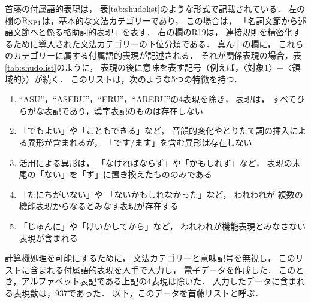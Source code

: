 \documentclass[japanese]{jnlp_1.3e}
\begin{document}
\begin{table}[b]

\end{table}

首藤の付属語的表現は，
表\ref{tab:shudolist}のような形式で記載されている．
左の欄の${\rm R_{NP1}}$は，基本的な文法カテゴリーであり，
この場合は，
「名詞文節から述語文節へと係る格助詞的表現」を表す．
右の欄のR19は，
連接規則を精密化するために導入された文法カテゴリーの下位分類である．
真ん中の欄に，
これらのカテゴリーに属する付属語的表現が記述される．
それが関係表現の場合，表\ref{tab:shudolist}のように，
表現の後に意味を表す記号（例えば，〈対象1〉+〈領域的〉）が続く．
このリストは，次のような5つの特徴を持つ．
\begin{enumerate}
\item ``ASU''，``ASERU''，``ERU''，``ARERU''の4表現を除き，
      表現は，
      すべてひらがな表記であり，漢字表記のものは存在しない
\item 「でもよい」や「こともできる」など，
      音韻的変化やとりたて詞の挿入による異形が含まれるが，
      「です/ます」を含む異形は存在しない
\item 活用による異形は，
      「なければならず」や「かもしれず」など，
      表現の末尾の「ない」を「ず」に置き換えたもののみである
\item 「たにちがいない」や
      「ないかもしれなかった」など，
      われわれが
      複数の機能表現からなるとみなす表現が存在する
\item 「じゅんに」や「けいかしてから」など，
      われわれが機能表現とみなさない表現が含まれる
\end{enumerate}
計算機処理を可能にするために，
文法カテゴリーと意味記号を無視し，
このリストに含まれる付属語的表現を人手で入力し，
電子データを作成した．
このとき，アルファベット表記である上記の4表現は除いた．
入力したデータに含まれる表現数は，937であった．
以下，このデータを首藤リストと呼ぶ．
\end{document}
